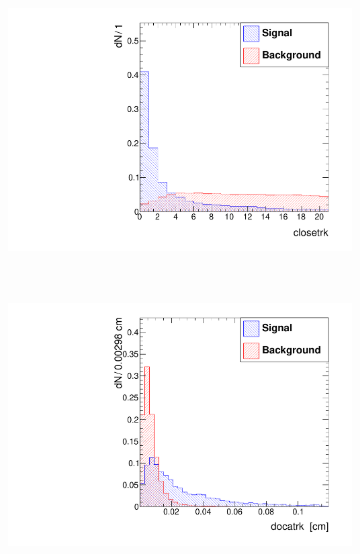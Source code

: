 \documentclass[10pt,a4paper]{article}
\begin{document}
\begin{figure}
\begin{subfigure}[b]{0.2\textwidth}
                \includegraphics[width=\textwidth]{Figures/closetrk_barrel}
                \label{fig:closetrkBarrel}
        \end{subfigure}
        ~
        \begin{subfigure}[b]{0.2\textwidth}
                \centering
                \includegraphics[width=\textwidth]{Figures/docatrk_barrel}
                \label{fig:docatrkBarrel}
        \end{subfigure}


\end{figure}
\end{document}
